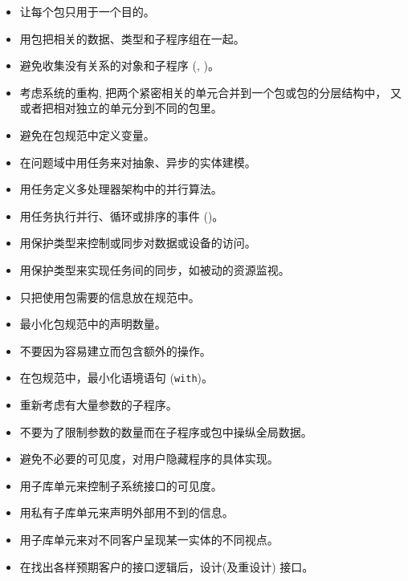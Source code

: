 \begin{itemize}
\item 让每个包只用于一个目的。
\item 用包把相关的数据、类型和子程序组在一起。
\item 避免收集没有关系的对象和子程序 (\cite{nasa87}, \cite{nissen84})。
\item 考虑系统的重构, 把两个紧密相关的单元合并到一个包或包的分层结构中，
又或者把相对独立的单元分到不同的包里。

\item 避免在包规范中定义变量。

\item 在问题域中用任务来对抽象、异步的实体建模。
\item 用任务定义多处理器架构中的并行算法。
\item 用任务执行并行、循环或排序的事件 (\cite{nasa87})。

\item 用保护类型来控制或同步对数据或设备的访问。
\item 用保护类型来实现任务间的同步，如被动的资源监视。
\end{itemize}

\begin{itemize}
\item 只把使用包需要的信息放在规范中。
\item 最小化包规范中的声明数量。
\item 不要因为容易建立而包含额外的操作。
\item 在包规范中，最小化语境语句 (\texttt{with})。
\item 重新考虑有大量参数的子程序。
\item 不要为了限制参数的数量而在子程序或包中操纵全局数据。
\item 避免不必要的可见度，对用户隐藏程序的具体实现。
\item 用子库单元来控制子系统接口的可见度。
\item 用私有子库单元来声明外部用不到的信息。
\item 用子库单元来对不同客户呈现某一实体的不同视点。
\item 在找出各样预期客户的接口逻辑后，设计(及重设计) 接口。

\end{itemize}
